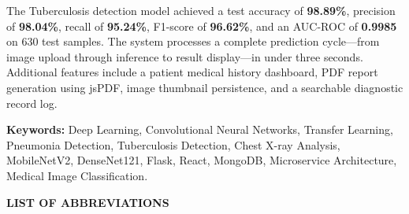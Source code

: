 \documentclass[12pt, a4paper, oneside]{report}
\begin{document}
The Tuberculosis detection model achieved a test accuracy of \textbf{98.89\%}, precision of \textbf{98.04\%}, recall of \textbf{95.24\%}, F1-score of \textbf{96.62\%}, and an AUC-ROC of \textbf{0.9985} on 630 test samples. The system processes a complete prediction cycle---from image upload through inference to result display---in under three seconds. Additional features include a patient medical history dashboard, PDF report generation using jsPDF, image thumbnail persistence, and a searchable diagnostic record log.

\vspace{0.5cm}
\noindent\textbf{Keywords:} Deep Learning, Convolutional Neural Networks, Transfer Learning, Pneumonia Detection, Tuberculosis Detection, Chest X-ray Analysis, MobileNetV2, DenseNet121, Flask, React, MongoDB, Microservice Architecture, Medical Image Classification.

\onehalfspacing

\newpage
\tableofcontents

\newpage
{}
\listoftables

\newpage
{}
\listoffigures

\newpage
{}
\begin{center}
{\Large \textbf{LIST OF ABBREVIATIONS}}\\[1cm]
\end{center}
\end{document}
